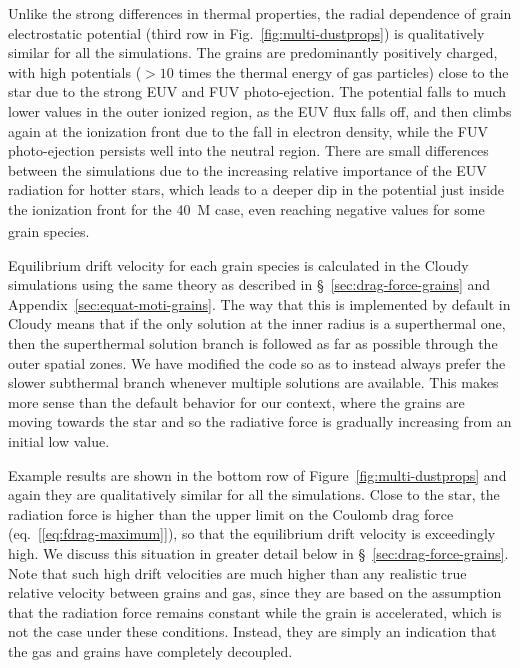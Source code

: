 Unlike the strong differences in thermal properties, the radial
dependence of grain electrostatic potential (third row in
Fig.~\ref{fig:multi-dustprops}) is qualitatively similar for all the
simulations.  The grains are predominantly positively charged, with high
potentials (\(> 10\) times the thermal energy of gas particles) close
to the star due to the strong EUV and FUV photo-ejection.  The
potential falls to much lower values in the outer ionized region, as
the EUV flux falls off, and then climbs again at the ionization front
due to the fall in electron density, while the FUV photo-ejection
persists well into the neutral region.  There are small differences
between the simulations due to the increasing relative importance of the
EUV radiation for hotter stars, which leads to a deeper dip in the
potential just inside the ionization front for the \SI{40}{M_\odot} case,
even reaching negative values for some grain species.

Equilibrium drift velocity for each grain species is calculated in the
Cloudy simulations using the same \citet{Draine:1979a} theory as
described in \S~\ref{sec:drag-force-grains} and
Appendix~\ref{sec:equat-moti-grains}.  The way that this is
implemented by default in Cloudy means that if the only solution at
the inner radius is a superthermal one, then the superthermal solution
branch is followed as far as possible through the outer spatial zones.
We have modified the code so as to instead always prefer the slower
subthermal branch whenever multiple solutions are available.  This
makes more sense than the default behavior for our context, where the
grains are moving towards the star and so the radiative force is
gradually increasing from an initial low value.

Example results are shown in the bottom row of
Figure~\ref{fig:multi-dustprops} and again they are qualitatively
similar for all the simulations.  Close to the star, the radiation
force is higher than the upper limit on the Coulomb drag force
(eq.~[\ref{eq:fdrag-maximum}]), so that the equilibrium drift velocity
is exceedingly high.  We discuss this situation in greater detail
below in \S~\ref{sec:drag-force-grains}.  Note that such high drift
velocities are much higher than any realistic true relative velocity
between grains and gas, since they are based on the assumption that
the radiation force remains constant while the grain is accelerated,
which is not the case under these conditions.  Instead, they are
simply an indication that the gas and grains have completely
decoupled.

